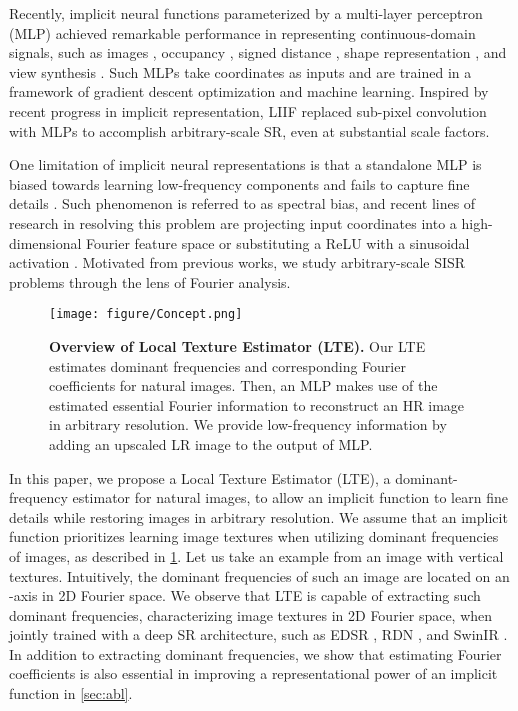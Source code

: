 \documentclass[10pt,twocolumn,letterpaper]{article}
\begin{document}
Recently, implicit neural functions parameterized by a multi-layer perceptron (MLP) achieved remarkable performance in representing continuous-domain signals, such as images \cite{chen2021learning}, occupancy \cite{Occupancy_Networks}, signed distance \cite{Park_2019_CVPR}, shape representation \cite{Local_Implicit_Grid_CVPR20}, and view synthesis \cite{sitzmann2019srns,mildenhall2020nerf}. Such MLPs take coordinates as inputs and are trained in a framework of gradient descent optimization and machine learning. Inspired by recent progress in implicit representation, LIIF \cite{chen2021learning} replaced sub-pixel convolution with MLPs to accomplish arbitrary-scale SR, even at substantial scale factors.

One limitation of implicit neural representations is that a standalone MLP is biased towards learning low-frequency components \cite{DBLP:conf/icml/RahamanBADLHBC19} and fails to capture fine details \cite{tancik2020fourfeat}. Such phenomenon is referred to as spectral bias, and recent lines of research in resolving this problem are projecting input coordinates into a high-dimensional Fourier feature space \cite{mildenhall2020nerf, tancik2020fourfeat} or substituting a ReLU with a sinusoidal activation \cite{sitzmann2019siren}. Motivated from previous works, we study arbitrary-scale SISR problems through the lens of Fourier analysis.






\begin{figure}[t]
\centering
\texttt{[image: figure/Concept.png]}
\vspace{-10pt}
\caption{\textbf{Overview of Local Texture Estimator (LTE).} Our LTE estimates dominant frequencies and corresponding Fourier coefficients for natural images. Then, an MLP makes use of the estimated essential Fourier information to reconstruct an HR image in arbitrary resolution. We provide low-frequency information by adding an upscaled LR image to the output of MLP.}
\label{fig:concept}
\vspace{-10pt}
\end{figure}

In this paper, we propose a Local Texture Estimator (LTE), a dominant-frequency estimator for natural images, to allow an implicit function to learn fine details while restoring images in arbitrary resolution. We assume that an implicit function prioritizes learning image textures when utilizing dominant frequencies of images, as described in \cref{fig:concept}. Let us take an example from an image with vertical textures. Intuitively, the dominant frequencies of such an image are located on an -axis in 2D Fourier space. We observe that LTE is capable of extracting such dominant frequencies, characterizing image textures in 2D Fourier space, when jointly trained with a deep SR architecture, such as EDSR \cite{Lim_2017_CVPR_Workshops}, RDN \cite{zhang2018residual}, and SwinIR \cite{liang2021swinir}. In addition to extracting dominant frequencies, we show that estimating Fourier coefficients is also essential in improving a representational power of an implicit function in \cref{sec:abl}.
\end{document}
